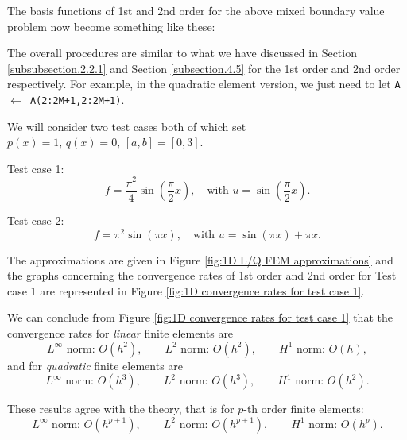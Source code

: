 	The basis functions of 1st and 2nd order for the above mixed boundary 
	value problem now become something like these:
	\begin{figure}[!htbp]
		\centering
		\begin{minipage}{.5\textwidth}
			
		\end{minipage}%
		\begin{minipage}{.5\textwidth}
			
		\end{minipage}
	\end{figure}
	
	The overall procedures are similar to what we have discussed in
	Section \ref{subsubsection.2.2.1} and Section \ref{subsection.4.5} for
	the 1st order and 2nd order respectively. For example, in the quadratic 
	element version, we just need to let \texttt{A $\gets$ A(2:2M+1,2:2M+1)}.
	
	We will consider two test cases both of which set $p(x)=1,\,q(x)=0,\,
	[a,b]=[0,3]$.
	
	Test case 1:
	\[ f= \frac{\pi^2}{4} \sin(\frac{\pi}{2}x),\quad 
	\textrm{with } u=\sin(\frac{\pi}{2}x).
	\]
	
	Test case 2:
	\[ f = \pi^2\sin(\pi x),\quad 
	\textrm{with } u=\sin(\pi x)+\pi x.
	\]
	
	The approximations are given in Figure \ref{fig:1D L/Q FEM approximations}
	and the graphs concerning the convergence rates of 1st order and 2nd order
	for Test case 1 are represented in Figure 
	\ref{fig:1D convergence rates for test case 1}.
	
	We can conclude from Figure \ref{fig:1D convergence rates for test case 1}
	that the convergence rates for \emph{linear} finite elements are
	\[L^\infty \textrm{ norm}:\, O(h^2),\qquad L^2 \textrm{ norm}:\, O(h^2),
	\qquad H^1 \textrm{ norm}:\, O(h),\]	
	and for \emph{quadratic} finite elements are
	\[L^\infty \textrm{ norm}:\, O(h^3),\qquad L^2 \textrm{ norm}:\, O(h^3),
	\qquad H^1 \textrm{ norm}:\, O(h^2).\]
	
	These results agree with the theory, that is for $p$-th order finite 
	elements:
	\[L^\infty \textrm{ norm}:\, O(h^{p+1}),\qquad L^2 \textrm{ norm}:\, 
	O(h^{p+1}),	\qquad H^1 \textrm{ norm}:\, O(h^p).\]
		
